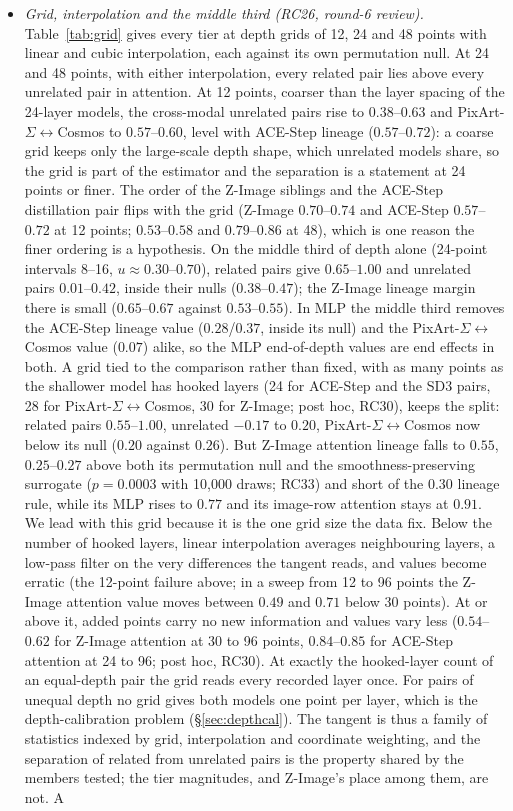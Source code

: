\documentclass[11pt]{article}
\begin{document}
\begin{itemize}
 \item \emph{Grid, interpolation and the middle third (RC26, round-6 review).} Table~\ref{tab:grid} gives every tier at depth grids of 12, 24 and 48 points with linear and cubic interpolation, each against its own permutation null. At 24 and 48 points, with either interpolation, every related pair lies above every unrelated pair in attention. At 12 points, coarser than the layer spacing of the 24-layer models, the cross-modal unrelated pairs rise to $0.38$--$0.63$ and PixArt-$\Sigma$$\leftrightarrow$Cosmos to $0.57$--$0.60$, level with ACE-Step lineage ($0.57$--$0.72$): a coarse grid keeps only the large-scale depth shape, which unrelated models share, so the grid is part of the estimator and the separation is a statement at 24 points or finer. The order of the Z-Image siblings and the ACE-Step distillation pair flips with the grid (Z-Image $0.70$--$0.74$ and ACE-Step $0.57$--$0.72$ at 12 points; $0.53$--$0.58$ and $0.79$--$0.86$ at 48), which is one reason the finer ordering is a hypothesis. On the middle third of depth alone (24-point intervals 8--16, $u\approx0.30$--$0.70$), related pairs give $0.65$--$1.00$ and unrelated pairs $0.01$--$0.42$, inside their nulls ($0.38$--$0.47$); the Z-Image lineage margin there is small ($0.65$--$0.67$ against $0.53$--$0.55$). In MLP the middle third removes the ACE-Step lineage value ($0.28$/$0.37$, inside its null) and the PixArt-$\Sigma$$\leftrightarrow$Cosmos value ($0.07$) alike, so the MLP end-of-depth values are end effects in both. A grid tied to the comparison rather than fixed, with as many points as the shallower model has hooked layers (24 for ACE-Step and the SD3 pairs, 28 for PixArt-$\Sigma$$\leftrightarrow$Cosmos, 30 for Z-Image; post hoc, RC30), keeps the split: related pairs $0.55$--$1.00$, unrelated $-0.17$ to $0.20$, PixArt-$\Sigma$$\leftrightarrow$Cosmos now below its null ($0.20$ against $0.26$). But Z-Image attention lineage falls to $0.55$, $0.25$--$0.27$ above both its permutation null and the smoothness-preserving surrogate ($p=0.0003$ with 10{,}000 draws; RC33) and short of the $0.30$ lineage rule, while its MLP rises to $0.77$ and its image-row attention stays at $0.91$. We lead with this grid because it is the one grid size the data fix. Below the number of hooked layers, linear interpolation averages neighbouring layers, a low-pass filter on the very differences the tangent reads, and values become erratic (the 12-point failure above; in a sweep from 12 to 96 points the Z-Image attention value moves between $0.49$ and $0.71$ below 30 points). At or above it, added points carry no new information and values vary less ($0.54$--$0.62$ for Z-Image attention at 30 to 96 points, $0.84$--$0.85$ for ACE-Step attention at 24 to 96; post hoc, RC30). At exactly the hooked-layer count of an equal-depth pair the grid reads every recorded layer once. For pairs of unequal depth no grid gives both models one point per layer, which is the depth-calibration problem (\S\ref{sec:depthcal}). The tangent is thus a family of statistics indexed by grid, interpolation and coordinate weighting, and the separation of related from unrelated pairs is the property shared by the members tested; the tier magnitudes, and Z-Image's place among them, are not. A 
\end{itemize}
\end{document}

